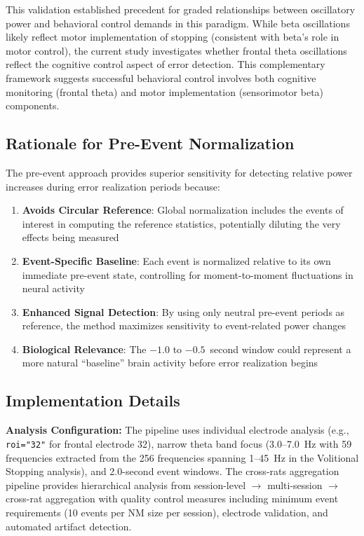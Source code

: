 \documentclass[11pt]{article}
\begin{document}
This validation established precedent for graded relationships between oscillatory power and behavioral control demands in this paradigm. While beta oscillations likely reflect motor implementation of stopping (consistent with beta's role in motor control), the current study investigates whether frontal theta oscillations reflect the cognitive control aspect of error detection. This complementary framework suggests successful behavioral control involves both cognitive monitoring (frontal theta) and motor implementation (sensorimotor beta) components.


\subsection{Rationale for Pre-Event Normalization}

The pre-event approach provides superior sensitivity for detecting relative power increases during error realization periods because:

\begin{enumerate}
\item \textbf{Avoids Circular Reference}: Global normalization includes the events of interest in computing the reference statistics, potentially diluting the very effects being measured
\item \textbf{Event-Specific Baseline}: Each event is normalized relative to its own immediate pre-event state, controlling for moment-to-moment fluctuations in neural activity
\item \textbf{Enhanced Signal Detection}: By using only neutral pre-event periods as reference, the method maximizes sensitivity to event-related power changes
\item \textbf{Biological Relevance}: The $-1.0$ to $-0.5$~second window could represent a more natural ``baseline'' brain activity before error realization begins
\end{enumerate}

\subsection{Implementation Details}

\textbf{Analysis Configuration:} The pipeline uses individual electrode analysis (e.g., \texttt{roi="32"} for frontal electrode 32), narrow theta band focus (3.0--7.0~Hz with 59 frequencies extracted from the 256 frequencies spanning 1--45~Hz in the Volitional Stopping analysis), and 2.0-second event windows. The cross-rats aggregation pipeline provides hierarchical analysis from session-level $\rightarrow$ multi-session $\rightarrow$ cross-rat aggregation with quality control measures including minimum event requirements (10 events per NM size per session), electrode validation, and automated artifact detection.
\end{document}
